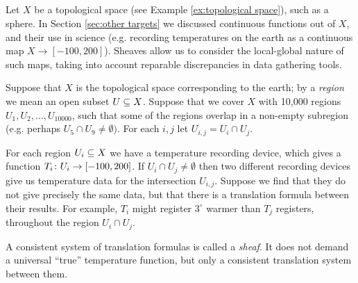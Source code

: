 \documentclass[CT4S-EN-RU]{subfiles}
\begin{document}
\begin{applicationRUS}
\end{applicationRUS}


\subsection{}\label{sec:sheaves}

\begin{blockENG}
Let $X$ be a topological space (see Example \ref{ex:topological space}), such as a sphere. In Section \ref{sec:other targets} we discussed continuous functions out of $X$, and their use in science (e.g. recording temperatures on the earth as a continuous map $X\to[-100,200]$). Sheaves allow us to consider the local-global nature of such maps, taking into account reparable discrepancies in data gathering tools. 
\end{blockENG}

\begin{blockRUS}
\end{blockRUS}

\begin{applicationENG}\label{app:sheaves of temperature}
Suppose that $X$ is the topological space corresponding to the earth; by a {\em region} we mean an open subset $U\ss X$. Suppose that we cover $X$ with 10,000 regions $U_1,U_2,\ldots,U_{10000}$, such that some of the regions overlap in a non-empty subregion (e.g. perhaps $U_5\cap U_9\neq\emptyset)$. For each $i,j$ let $U_{i,j}=U_i\cap U_j$. 

For each region $U_i\ss X$ we have a temperature recording device, which gives a function $T_i\taking U_i\to[-100,200]$. If $U_i\cap U_j\neq\emptyset$ then two different recording devices give us temperature data for the intersection $U_{i,j}$. Suppose we find that they do not give precisely the same data, but that there is a translation formula between their results. For example, $T_i$ might register $3^\circ$ warmer than $T_j$ registers, throughout the region $U_i\cap U_j$.

A consistent system of translation formulas is called a {\em sheaf}. It does not demand a universal “true” temperature function, but only a consistent translation system between them. 
\end{applicationENG}

\begin{applicationRUS}\label{app:sheaves of temperature}
\end{applicationRUS}
\end{document}
